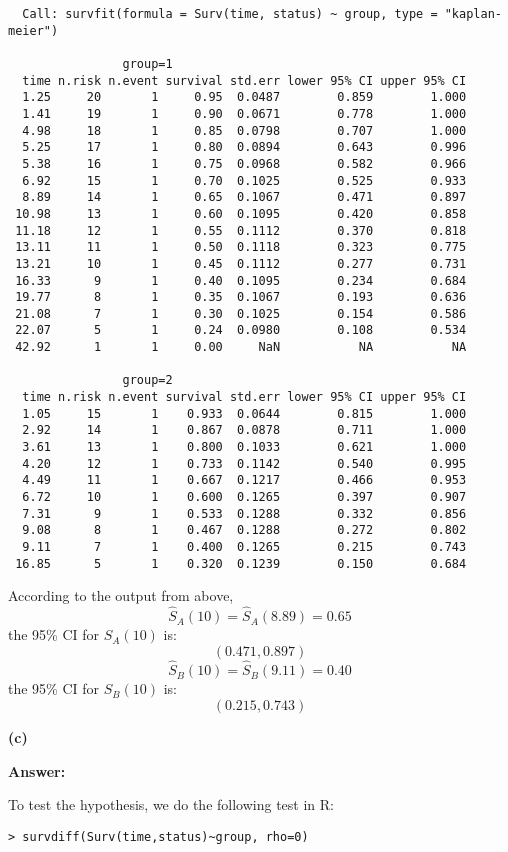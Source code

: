 \documentclass[letterpaper,11pt]{article}
\begin{document}
\begin{lstlisting}
  Call: survfit(formula = Surv(time, status) ~ group, type = "kaplan-meier")

                group=1
  time n.risk n.event survival std.err lower 95% CI upper 95% CI
  1.25     20       1     0.95  0.0487        0.859        1.000
  1.41     19       1     0.90  0.0671        0.778        1.000
  4.98     18       1     0.85  0.0798        0.707        1.000
  5.25     17       1     0.80  0.0894        0.643        0.996
  5.38     16       1     0.75  0.0968        0.582        0.966
  6.92     15       1     0.70  0.1025        0.525        0.933
  8.89     14       1     0.65  0.1067        0.471        0.897
 10.98     13       1     0.60  0.1095        0.420        0.858
 11.18     12       1     0.55  0.1112        0.370        0.818
 13.11     11       1     0.50  0.1118        0.323        0.775
 13.21     10       1     0.45  0.1112        0.277        0.731
 16.33      9       1     0.40  0.1095        0.234        0.684
 19.77      8       1     0.35  0.1067        0.193        0.636
 21.08      7       1     0.30  0.1025        0.154        0.586
 22.07      5       1     0.24  0.0980        0.108        0.534
 42.92      1       1     0.00     NaN           NA           NA

                group=2
  time n.risk n.event survival std.err lower 95% CI upper 95% CI
  1.05     15       1    0.933  0.0644        0.815        1.000
  2.92     14       1    0.867  0.0878        0.711        1.000
  3.61     13       1    0.800  0.1033        0.621        1.000
  4.20     12       1    0.733  0.1142        0.540        0.995
  4.49     11       1    0.667  0.1217        0.466        0.953
  6.72     10       1    0.600  0.1265        0.397        0.907
  7.31      9       1    0.533  0.1288        0.332        0.856
  9.08      8       1    0.467  0.1288        0.272        0.802
  9.11      7       1    0.400  0.1265        0.215        0.743
 16.85      5       1    0.320  0.1239        0.150        0.684
\end{lstlisting}


According to the output from above,
$$\hat{S}_A(10) = \hat{S}_A(8.89) = 0.65$$
the 95\% CI for $\hat{S}_A(10)$ is:
$$(0.471, 0.897)$$
$$\hat{S}_B(10) = \hat{S}_B(9.11) = 0.40$$
the 95\% CI for $\hat{S}_B(10)$ is:
$$(0.215,0.743)$$



\begin{addmargin}[-1.1em]{0em}
  \textbf{(c)}\par
\end{addmargin}
\textbf{}\par
\bigbreak
\begin{addmargin}[-0.5em]{0em}
  \textbf{Answer: }
\end{addmargin}
To test the hypothesis, we do the following test in R:
\begin{lstlisting}
> survdiff(Surv(time,status)~group, rho=0)
\end{lstlisting}
\end{document}
